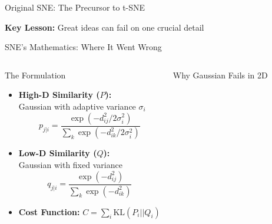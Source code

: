 \documentclass[aspectratio=169]{beamer}
\begin{document}
\begin{frame}{Original SNE: The Precursor to t-SNE}
\vspace{1mm}
\begin{center}
\colorbox{yellow!20}{\parbox{0.9\textwidth}{\centering
\textbf{Key Lesson:} Great ideas can fail on one crucial detail}}
\end{center}
\end{frame}


\begin{frame}{SNE's Mathematics: Where It Went Wrong}
\begin{columns}[T]

\begin{block}{The Formulation}
    \begin{itemize}
        \item \textbf{High-D Similarity ($P$):} \\
              Gaussian with adaptive variance $\sigma_i$
              $$ p_{j|i} = \frac{\exp(-d_{ij}^2/2\sigma_i^2)}{\sum_k \exp(-d_{ik}^2/2\sigma_i^2)} $$

        \item \textbf{Low-D Similarity ($Q$):} \\
              \alert{Gaussian with fixed variance}
              $$ q_{j|i} = \frac{\exp(-d_{ij}^2)}{\sum_k \exp(-d_{ik}^2)} $$

        \item \textbf{Cost Function:} $C = \sum_i \mathrm{KL}(P_i || Q_i)$
    \end{itemize}
\end{block}

\begin{block}{Why Gaussian Fails in 2D}
    \centering %
\end{block}
\end{columns}
\end{frame}
\end{document}
